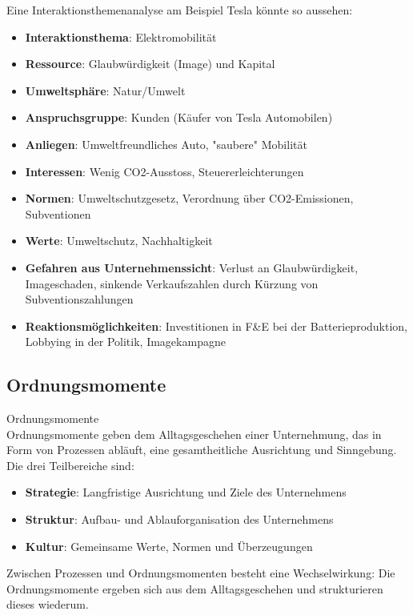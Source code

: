 \begin{example}
Eine Interaktionsthemenanalyse am Beispiel Tesla könnte so aussehen:
\begin{itemize}
    \item \textbf{Interaktionsthema}: Elektromobilität
    \item \textbf{Ressource}: Glaubwürdigkeit (Image) und Kapital
    \item \textbf{Umweltsphäre}: Natur/Umwelt
    \item \textbf{Anspruchsgruppe}: Kunden (Käufer von Tesla Automobilen)
    \item \textbf{Anliegen}: Umweltfreundliches Auto, "saubere" Mobilität
    \item \textbf{Interessen}: Wenig CO2-Ausstoss, Steuererleichterungen
    \item \textbf{Normen}: Umweltschutzgesetz, Verordnung über CO2-Emissionen, Subventionen
    \item \textbf{Werte}: Umweltschutz, Nachhaltigkeit
    \item \textbf{Gefahren aus Unternehmenssicht}: Verlust an Glaubwürdigkeit, Imageschaden, sinkende Verkaufszahlen durch Kürzung von Subventionszahlungen
    \item \textbf{Reaktionsmöglichkeiten}: Investitionen in F\&E bei der Batterieproduktion, Lobbying in der Politik, Imagekampagne
\end{itemize}
\end{example}

\subsection{Ordnungsmomente}

\begin{definition}{Ordnungsmomente}\\
Ordnungsmomente geben dem Alltagsgeschehen einer Unternehmung, das in Form von Prozessen abläuft, eine gesamtheitliche Ausrichtung und Sinngebung. Die drei Teilbereiche sind:
\begin{itemize}
    \item \textbf{Strategie}: Langfristige Ausrichtung und Ziele des Unternehmens
    \item \textbf{Struktur}: Aufbau- und Ablauforganisation des Unternehmens
    \item \textbf{Kultur}: Gemeinsame Werte, Normen und Überzeugungen
\end{itemize}
Zwischen Prozessen und Ordnungsmomenten besteht eine Wechselwirkung: Die Ordnungsmomente ergeben sich aus dem Alltagsgeschehen und strukturieren dieses wiederum.
\end{definition}

